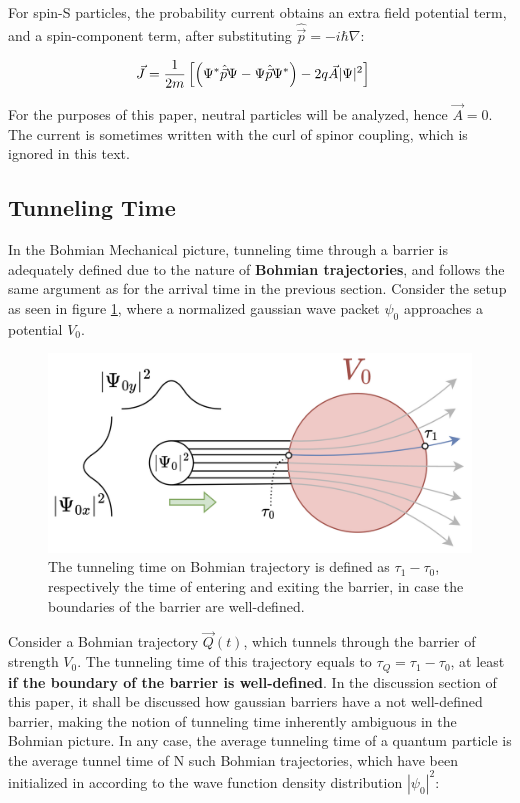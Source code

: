 For spin-S particles, the probability current obtains an extra field potential term, and a spin-component term, after substituting $\hat{\vec{p}} = -i\hbar \nabla$:

\begin{align}
\label{eq:spin-s}
\vec{J} &= \frac{1}{2m} \left[ \left( \Psi^* \space \hat{\vec{p}} \space \Psi - \Psi \space \hat{\vec{p}} \space \Psi^* \right) 
- 2q \space \vec{A} \space |\Psi|^2 \right]
\end{align}

For the purposes of this paper, neutral particles will be analyzed, hence $\vec{A}=0$. The current is sometimes written with the curl of spinor coupling, which is ignored in this text.

\subsection{Tunneling Time}

In the Bohmian Mechanical picture, tunneling time through a barrier is adequately defined due to the nature of \textbf{Bohmian trajectories}, and follows the same argument as for the arrival time in the previous section. Consider the setup as seen in figure \ref{fig:bohmian-tunneling}, where a normalized gaussian wave packet $\psi_0$ approaches a potential $V_0$.

\begin{figure}
    \centering
    \includegraphics[width=1\linewidth]{Figures/tunneling_time_bohm.png}
    \caption{The tunneling time on Bohmian trajectory is defined as $\tau_1 - \tau_0$, respectively the time of entering and exiting the barrier, in case the boundaries of the barrier are well-defined.}
    \label{fig:bohmian-tunneling}
\end{figure}

Consider a Bohmian trajectory $\vec{Q}(t)$, which tunnels through the barrier of strength $V_0$. The tunneling time of this trajectory equals to $\tau_{Q} = \tau_1 - \tau_0$, at least \textbf{if the boundary of the barrier is well-defined}. In the discussion section of this paper, it shall be discussed how gaussian barriers have a not well-defined barrier, making the notion of tunneling time inherently ambiguous in the Bohmian picture. In any case, the average tunneling time of a quantum particle is the average tunnel time of N such Bohmian trajectories, which have been initialized in according to the wave function density distribution $|\psi_0|^2$:

